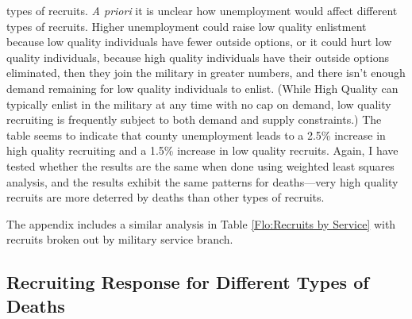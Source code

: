 \documentclass[12pt] {article}
\begin{document}
types of recruits. \emph{A priori} it is unclear how unemployment
would affect different types of recruits. Higher unemployment could
raise low quality enlistment because low quality individuals have
fewer outside options, or it could hurt low quality individuals, because
high quality individuals have their outside options eliminated, then
they join the military in greater numbers, and there isn't enough
demand remaining for low quality individuals to enlist. (While High
Quality can typically enlist in the military at any time with no cap
on demand, low quality recruiting is frequently subject to both demand
and supply constraints.) The table seems to indicate that county unemployment
leads to a 2.5\% increase in high quality recruiting and a 1.5\% increase
in low quality recruits. Again, I have tested whether the results are
the same when done using weighted least squares analysis, and the
results exhibit the same patterns for deaths---very high quality recruits
are more deterred by deaths than other types of recruits.

The appendix includes a similar analysis in Table \ref{Flo:Recruits by Service} with recruits broken out by military service branch.

\subsection{Recruiting Response for Different Types of Deaths\label{sub:Different Death Types}}
\end{document}
